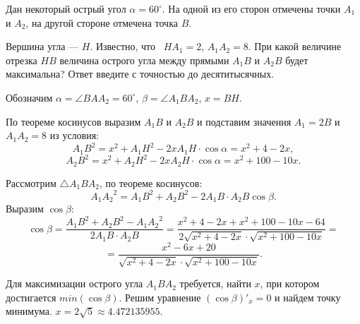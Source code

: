 
Дан некоторый острый угол $\alpha = 60^{\circ}$. На одной из его сторон отмечены точки $A_1$ и $A_2$, 
на другой стороне отмечена точка $B$. 

Вершина угла — $H$. Известно, что  $HA_1=2$, $A_1A_2=8$. 
При какой величине отрезка $HB$ величина острого угла между прямыми $A_1B$ и $A_2B$  будет максимальна? 
Ответ введите с точностью до десятитысячных.

\soultionSection

Обозначим $\alpha = \angle BAA_2=60^{\circ}$, $\beta = \angle A_1BA_2$, $x = BH$. 


По теореме косинусов выразим $A_1B$ и $A_2B$ и подставим значения $A_1 = 2B$ и $A_1A_2 = 8$ из условия:
$$A_1B^2 = x^2 + A_1H^2 - 2xA_1H\cdot \cos\alpha = x^2 + 4 - 2x,$$
$$A_2B^2 = x^2 + A_2H^2 - 2xA_2H\cdot \cos\alpha = x^2 + 100 - 10x.$$

Рассмотрим $\triangle A_1BA_2$, по теореме косинусов:
$${A_1A_2}^2 = A_1B^2 + A_2B^2 - 2A_1B\cdot A_2B \cos\beta.$$
Выразим $\cos\beta$:
$$\cos\beta = \frac{A_1B^2 + A_2B^2 - {A_1A_2}^2}{2A_1B\cdot A_2B} = \frac{x^2 + 4 - 2x + x^2 + 100 - 10x - 64}{2\sqrt{x^2 + 4 - 2x} \cdot \sqrt{x^2 + 100 - 10x}} =  $$
$$=\frac{x^2 - 6x + 20}{\sqrt{x^2 + 4 - 2x} \cdot \sqrt{x^2 + 100 - 10x}}.$$

Для максимизации острого угла $A_1BA_2$ требуется, найти $x$, при котором достигается $min(\cos\beta)$. Решим уравнение $(\cos\beta)'_x = 0$ и найдем точку минимума. $x = 2\sqrt{5} \approx 4.472135955$.

